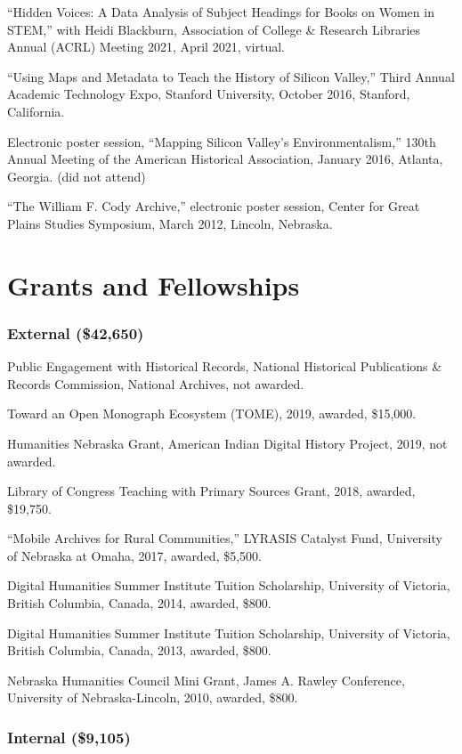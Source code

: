 ``Hidden Voices: A Data Analysis of Subject Headings for Books on Women
in STEM,'' with Heidi Blackburn, Association of College \& Research
Libraries Annual (ACRL) Meeting 2021, April 2021, virtual.

``Using Maps and Metadata to Teach the History of Silicon Valley,''
Third Annual Academic Technology Expo, Stanford University, October
2016, Stanford, California.

Electronic poster session, ``Mapping Silicon Valley's
Environmentalism,'' 130th Annual Meeting of the American Historical
Association, January 2016, Atlanta, Georgia. (did not attend)

``The William F. Cody Archive,'' electronic poster session, Center for
Great Plains Studies Symposium, March 2012, Lincoln, Nebraska.

\section{Grants and Fellowships}\label{grants-and-fellowships}

\subsubsection{External (\$42,650)}\label{external-42650}

Public Engagement with Historical Records, National Historical
Publications \& Records Commission, National Archives, not awarded.

Toward an Open Monograph Ecosystem (TOME), 2019, awarded, \$15,000.

Humanities Nebraska Grant, American Indian Digital History Project,
2019, not awarded.

Library of Congress Teaching with Primary Sources Grant, 2018, awarded,
\$19,750.

``Mobile Archives for Rural Communities,'' LYRASIS Catalyst Fund,
University of Nebraska at Omaha, 2017, awarded, \$5,500.

Digital Humanities Summer Institute Tuition Scholarship, University of
Victoria, British Columbia, Canada, 2014, awarded, \$800.

Digital Humanities Summer Institute Tuition Scholarship, University of
Victoria, British Columbia, Canada, 2013, awarded, \$800.

Nebraska Humanities Council Mini Grant, James A. Rawley Conference,
University of Nebraska-Lincoln, 2010, awarded, \$800.

\subsubsection{Internal (\$9,105)}\label{internal-9105}

